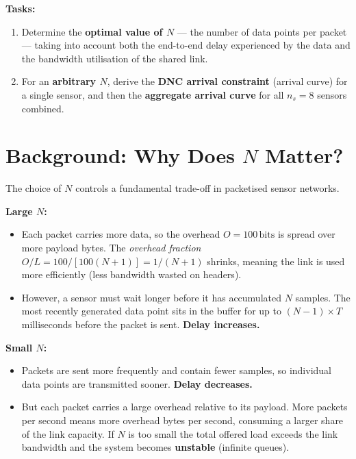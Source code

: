 \documentclass[12pt, a4paper]{article}
\begin{document}
\textbf{Tasks:}
\begin{enumerate}[leftmargin=1.6em, itemsep=4pt]
  \item Determine the \textbf{optimal value of $N$} --- the number of data points
    per packet --- taking into account both the end-to-end delay experienced by
    the data and the bandwidth utilisation of the shared link.
  \item For an \textbf{arbitrary $N$}, derive the \textbf{DNC arrival constraint}
    (arrival curve) for a single sensor, and then the \textbf{aggregate arrival
    curve} for all $n_s = 8$ sensors combined.
\end{enumerate}

\section*{Background: Why Does $N$ Matter?}

The choice of $N$ controls a fundamental trade-off in packetised sensor
networks.

\textbf{Large $N$:}
\begin{itemize}[leftmargin=1.4em, itemsep=2pt]
  \item Each packet carries more data, so the overhead $O = 100\,\mathrm{bits}$
    is spread over more payload bytes.
    The \emph{overhead fraction} $O/L = 100/[100(N+1)] = 1/(N+1)$ shrinks,
    meaning the link is used more efficiently (less bandwidth wasted on headers).
  \item However, a sensor must wait longer before it has accumulated $N$ samples.
    The most recently generated data point sits in the buffer for up to
    $(N-1) \times T$ milliseconds before the packet is sent.
    \textbf{Delay increases.}
\end{itemize}

\textbf{Small $N$:}
\begin{itemize}[leftmargin=1.4em, itemsep=2pt]
  \item Packets are sent more frequently and contain fewer samples, so individual
    data points are transmitted sooner. \textbf{Delay decreases.}
  \item But each packet carries a large overhead relative to its payload. More
    packets per second means more overhead bytes per second, consuming a larger
    share of the link capacity. If $N$ is too small the total offered load exceeds
    the link bandwidth and the system becomes \textbf{unstable} (infinite queues).
\end{itemize}
\end{document}
